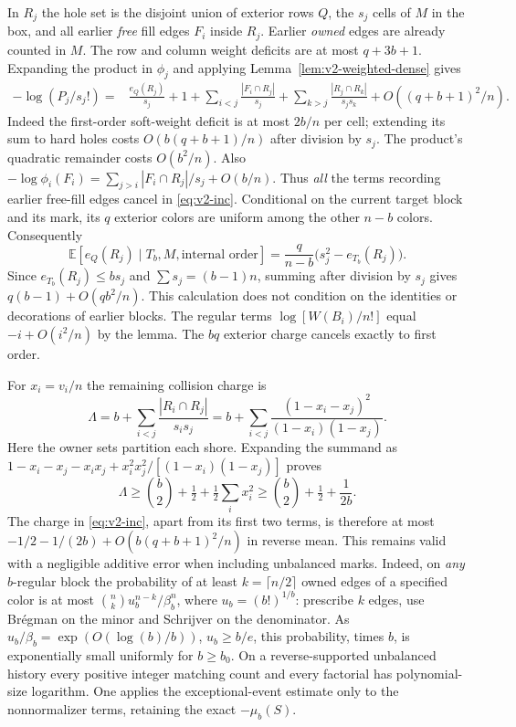 In $R_j$ the hole set is the disjoint union of exterior rows $Q$, the
$s_j$ cells of $M$ in the box, and all earlier \emph{free} fill edges
$F_i$ inside $R_j$. Earlier \emph{owned} edges are already counted in
$M$. The row and column weight deficits are at most $q+3b+1$.
Expanding the product in $\phi_j$ and applying
Lemma~\ref{lem:v2-weighted-dense} gives
\begin{align*}
 -\log(P_j/s_j!)={}&
 \frac{e_Q(R_j)}{s_j}+1+
 \sum_{i<j}\frac{|F_i\cap R_j|}{s_j}+
 \sum_{k>j}\frac{|R_j\cap R_k|}{s_js_k}
 +O((q+b+1)^2/n).
\end{align*}
Indeed the first-order soft-weight deficit is at most $2b/n$ per cell;
extending its sum to hard holes costs $O(b(q+b+1)/n)$ after division
by $s_j$. The product's quadratic remainder costs $O(b^2/n)$.
Also $-\log\phi_i(F_i)=\sum_{j>i}|F_i\cap R_j|/s_j+O(b/n)$.
Thus \emph{all} the terms recording earlier free-fill edges cancel in
\eqref{eq:v2-inc}. Conditional on the current target block and its
mark, its $q$ exterior colors are uniform among the other $n-b$ colors.
Consequently
\[
 \mathbb E[e_Q(R_j)\mid T_b,M,\text{internal order}]
      =\frac{q}{n-b}\bigl(s_j^2-e_{T_b}(R_j)\bigr).
\]
Since $e_{T_b}(R_j)\le b s_j$ and $\sum s_j=(b-1)n$, summing after
division by $s_j$ gives $q(b-1)+O(qb^2/n)$. This calculation does
not condition on the identities or decorations of earlier blocks.
The regular terms $\log[W(B_i)/n!]$ equal $-i+O(i^2/n)$ by the lemma.
The $bq$ exterior charge cancels exactly to first order.

For $x_i=v_i/n$ the remaining collision charge is
\[
 \Lambda=b+\sum_{i<j}\frac{|R_i\cap R_j|}{s_i s_j}
       = b+\sum_{i<j}\frac{(1-x_i-x_j)^2}{(1-x_i)(1-x_j)}.
\]
Here the owner sets partition each shore. Expanding the summand as
$1-x_i-x_j-x_ix_j+x_i^2x_j^2/[(1-x_i)(1-x_j)]$ proves
\begin{equation}\label{eq:v2-lambda}
 \Lambda\ge \binom b2+\tfrac12+\tfrac12\sum_i x_i^2
          \ge \binom b2+\tfrac12+\frac1{2b}.
\end{equation}
The charge in \eqref{eq:v2-inc}, apart from its first two terms, is
therefore at most $-1/2-1/(2b)+O(b(q+b+1)^2/n)$ in reverse mean. This
remains valid with a negligible additive error when including unbalanced
marks. Indeed, on \emph{any} $b$-regular block the probability of at
least $k=\lceil n/2\rceil$ owned edges of a specified color is at most
$\binom nk u_b^{n-k}/\beta_b^n$, where $u_b=(b!)^{1/b}$: prescribe
$k$ edges, use Br\'egman on the minor and Schrijver on the denominator.
As $u_b/\beta_b=\exp(O(\log(b)/b))$, $u_b\ge b/e$, this probability,
times $b$, is exponentially small uniformly for $b\ge b_0$. On a
reverse-supported unbalanced history every positive integer matching
count and every factorial has polynomial-size logarithm. One applies
the exceptional-event estimate only to the nonnormalizer terms, retaining
the exact $-\mu_b(S)$.

